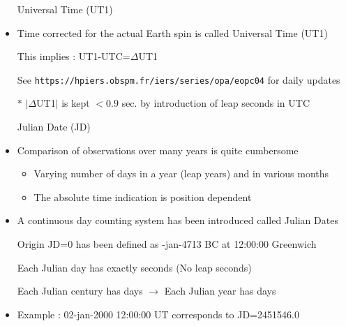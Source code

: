 \Tr
\begin{itemize}
\item[] \begin{center}{\red Universal Time (UT1)}\end{center}
\item Time corrected for the actual Earth spin is called {\blue Universal Time (UT1)} 
\item[] This implies : {\blue UT1-UTC=$\Delta$UT1}
\item[] See {\tt https://hpiers.obspm.fr/iers/series/opa/eopc04} for daily updates
\item[$\ast$] $|\Delta$UT1$|$ is kept $<0.9$ sec. by introduction of leap seconds in UTC
\item[] \begin{center}{\red Julian Date (JD)}\end{center}
\item Comparison of observations over many years is quite cumbersome
\begin{itemize}
\item Varying number of days in a year (leap years) and in various months
\item The absolute time indication is position dependent
\end{itemize}
\item A {\blue continuous day counting system} has been introduced called {\blue Julian Dates}
\item[] {\blue Origin JD=0} has been defined as {-jan-4713 BC at 12:00:00 Greenwich}
\item[] Each {\blue Julian day} has exactly { seconds} (No leap seconds)
\item[] Each {\blue Julian century} has { days} $\rightarrow$ Each {\blue Julian year} has { days}
\item Example : 02-jan-2000 12:00:00 UT corresponds to JD=2451546.0
\end{itemize}

